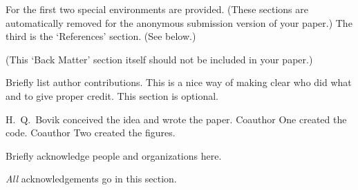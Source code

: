 \documentclass{uai2023} %
\begin{document}
For the first two special environments are provided.
(These sections are automatically removed for the anonymous submission version of your paper.)
The third is the ‘References’ section.
(See below.)

(This ‘Back Matter’ section itself should not be included in your paper.)


\begin{contributions} %
    Briefly list author contributions. 
    This is a nice way of making clear who did what and to give proper credit.
    This section is optional.

    H.~Q.~Bovik conceived the idea and wrote the paper.
    Coauthor One created the code.
    Coauthor Two created the figures.
\end{contributions}

\begin{acknowledgements} %
    Briefly acknowledge people and organizations here.

    \emph{All} acknowledgements go in this section.
\end{acknowledgements}


\end{document}
